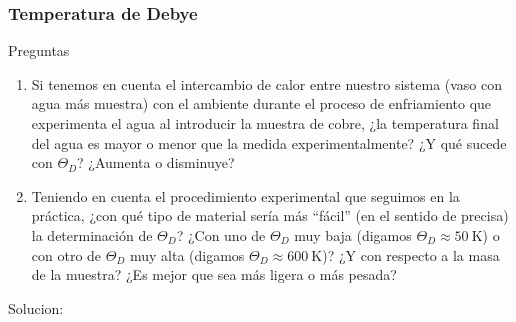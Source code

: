 \begin{Enunciado}
	\subsubsection{Temperatura de Debye}
	Preguntas
	\begin{enumerate}[label=\alph*)]
		\item Si tenemos en cuenta el intercambio de calor entre nuestro sistema (vaso con agua más muestra) con el ambiente durante el proceso de enfriamiento que experimenta el agua al introducir la muestra de cobre, ¿la temperatura final del agua es mayor o menor que la medida experimentalmente? ¿Y qué sucede con $\Theta_D$? ¿Aumenta o disminuye?
		\item Teniendo en cuenta el procedimiento experimental que seguimos en la práctica, ¿con qué tipo de material sería más “fácil” (en el sentido de precisa) la determinación de $\Theta_D$? ¿Con uno de $\Theta_D$ muy baja (digamos $\Theta_D \approx 50\ \text{K}$) o con otro de $\Theta_D$ muy alta (digamos $\Theta_D \approx 600\ \text{K}$)? ¿Y con respecto a la masa de la muestra? ¿Es mejor que sea más ligera o más pesada?
	\end{enumerate}
\end{Enunciado}

Solucion:

